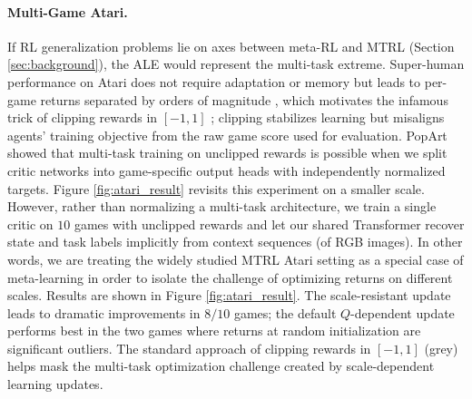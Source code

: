 \documentclass{article}
\begin{document}
\paragraph{Multi-Game Atari.} If RL generalization problems lie on axes between meta-RL and MTRL (Section \ref{sec:background}), the ALE \cite{bellemare2013arcade} would represent the multi-task extreme. Super-human performance on Atari does not require adaptation or memory but leads to per-game returns separated by orders of magnitude \cite{hessel2018rainbow}, which motivates the infamous trick of clipping rewards in $[-1, 1]$ \cite{mnih2015human}; clipping stabilizes learning but misaligns agents' training objective from the raw game score used for evaluation. PopArt \cite{hessel2019multi} showed that multi-task training on unclipped rewards is possible when we split critic networks into game-specific output heads with independently normalized targets. Figure \ref{fig:atari_result} revisits this experiment on a smaller scale. However, rather than normalizing a multi-task architecture, we train a single critic on $10$ games with unclipped rewards and let our shared Transformer recover state and task labels implicitly from context sequences (of RGB images). In other words, we are treating the widely studied MTRL Atari setting as a special case of meta-learning in order to isolate the challenge of optimizing returns on different scales. Results are shown in Figure \ref{fig:atari_result}. The scale-resistant update leads to dramatic improvements in $8/10$ games; the default $Q$-dependent update performs best in the two games where returns at random initialization are significant outliers. The standard approach of clipping rewards in $[-1, 1]$ (grey) helps mask the multi-task optimization challenge created by scale-dependent learning updates.
\end{document}
